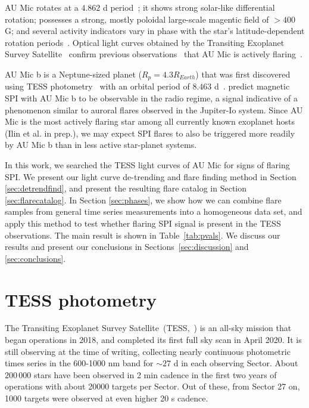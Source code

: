 \documentclass[fleqn,usenatbib,letters]{mnras}%
\begin{document}
AU Mic rotates at a $4.862$ d period~\citep{plavchan2020}; it shows strong solar-like differential rotation; possesses a strong, mostly poloidal large-scale magentic field of $>400$ G; and several activity indicators vary in phase with the star's latitude-dependent rotation periods~\citep{klein2021}. Optical light curves obtained by the Transiting Exoplanet Survey Satellite~\citep[TESS,][]{ricker2014} confirm previous observations~\citep{katsova1999, robinson2001, redfield2002} that AU Mic is actively flaring~\citep{martioli2021new}.

AU Mic b is a Neptune-sized planet ($R_p = 4.3R_{Earth}$) that was first discovered using TESS photometry~\citep{plavchan2020} with an orbital period of $8.463$ d~\citep{plavchan2020,martioli2021new}. %
\citet{kavanagh2021} predict magnetic SPI with AU Mic b to be observable in the radio regime, a signal indicative of a phenomenon similar to auroral flares observed in the Jupiter-Io system. Since AU Mic is the most actively flaring star among all currently known exoplanet hosts (Ilin et al. in prep.), we may expect SPI flares to also be triggered more readily by AU Mic b than in less active star-planet systems. 

In this work, we searched the TESS light curves of AU Mic for signs of flaring SPI. We present our light curve de-trending and flare finding method in Section \ref{sec:detrendfind}, and present the resulting flare catalog in Section \ref{sec:flarecatalog}. In Section \ref{sec:phases}, we show how we can combine flare samples from general time series measurements into a homogeneous data set, and apply this method to test whether flaring SPI signal is present in the TESS observations. The main result is shown in Table~\ref{tab:pvals}. We discuss our results and present our conclusions in Sections~\ref{sec:discussion} and \ref{sec:conclusions}.


\section{TESS photometry}
The Transiting Exoplanet Survey Satellite~(TESS,~\citealt{ricker2014}) is an all-sky mission that began operations in 2018, and completed its first full sky scan in April 2020. It is still observing at the time of writing, collecting nearly continuous photometric times series in the 600-1000 nm band for $\sim 27$ d in each observing Sector. About $200\,000$ stars have been observed in 2 min cadence in the first two years of operations with about 20000 targets per Sector. Out of these, from Sector 27 on, 1000 targets were observed at even higher 20 s cadence.
\end{document}
